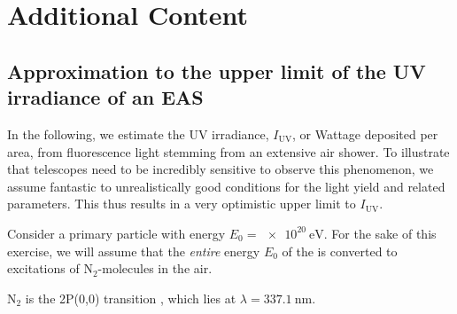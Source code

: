 
\chapter{Additional Content}
\label{app:other}

\section{Approximation to the upper limit of the UV irradiance of an EAS}
\label{app:cr-uv-irradiance}

In the following, we estimate the UV irradiance, $I_\text{UV}$, or Wattage 
deposited per area, from fluorescence light stemming from an extensive air 
shower. To illustrate that telescopes need to be incredibly sensitive to 
observe this phenomenon, we assume fantastic to unrealistically good conditions
for the \UV light yield and related parameters. This thus results in a very 
optimistic upper limit to $I_\text{UV}$.

Consider a primary particle with energy $E_0 = \SI{e20}{\eV}$. For the sake of 
this exercise, we will assume that the \textit{entire} energy $E_0$ of the \CR 
is converted to excitations of $\text{N}_2$-molecules in the air. 



$\text{N}_2$ is the 2P(0,0)
transition \cite{Ave2008}, which lies at $\lambda=\SI{337.1}{\nano\meter}$.
